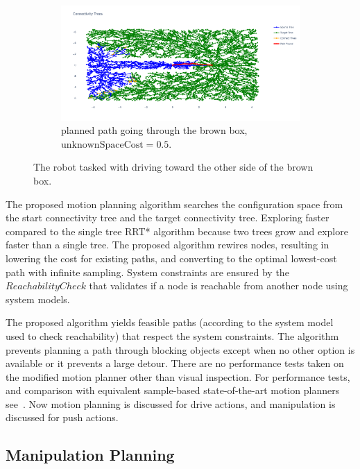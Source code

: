\begin{figure}[H]
    \begin{subfigure}{1.11\textwidth}
    \centering
    \includegraphics[width=\textwidth]{figures/mp_low_fixed_cost}
    \caption{planned path going through the brown box, $\textrm{unknownSpaceCost} = 0.5$.}
    \end{subfigure}
    \caption{The robot tasked with driving toward the other side of the brown box.}%
    \label{fig:mp_push_or_drive}
\end{figure}

The proposed motion planning algorithm searches the configuration space from the start connectivity tree and the target connectivity tree. Exploring faster compared to the single tree \ac{RRT*} algorithm because two trees grow and explore faster than a single tree. The proposed algorithm rewires nodes, resulting in lowering the cost for existing paths, and converting to the optimal lowest-cost path with infinite sampling. System constraints are ensured by the $ReachabilityCheck$ that validates if a node is reachable from another node using system models.\bs

The proposed algorithm yields feasible paths (according to the system model used to check reachability) that respect the system constraints. The algorithm prevents planning a path through blocking objects except when no other option is available or it prevents a large detour. There are no performance tests taken on the modified motion planner other than visual inspection. For performance tests, and comparison with equivalent sample-based state-of-the-art motion planners see~\cite{chen_fast_2018}. Now motion planning is discussed for drive actions, and manipulation is discussed for push actions.

\subsection{Manipulation Planning}%
\label{subsec:manipulation_planning}

